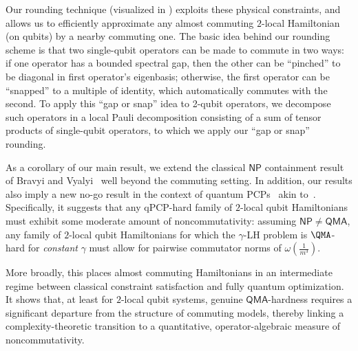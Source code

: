 \documentclass[11pt]{article}
\theoremstyle{plain}
\begin{document}
Our rounding technique (visualized in ) exploits these physical constraints, 
and allows us to
efficiently approximate any almost commuting $2$-local 
Hamiltonian (on qubits) by a nearby commuting one. The basic idea behind our rounding scheme is that two single-qubit operators can be made to commute in two ways: if one operator has a bounded spectral gap, then the other can be ``pinched'' to be diagonal in first operator's eigenbasis; otherwise, the first operator can be ``snapped'' to a multiple of identity, which automatically commutes with the second. To apply this ``gap or snap'' idea to 2-qubit operators, we decompose such operators in a local Pauli decomposition consisting of a sum of tensor products of single-qubit operators, to which we apply our ``gap or snap'' rounding.  

As a corollary of our main result, we extend the classical $\mathsf{NP}$ containment result of Bravyi and Vyalyi~\cite{bravyi2004commutativeversionklocalhamiltonian} well
beyond the commuting setting.
In addition, our results also imply a new no-go result in the context of quantum PCPs~\cite{aharonov2011complexity,Hastings2012} akin to~\cite{arad2011notepartialnogotheorem}. Specifically, it suggests that any qPCP-hard family of $2$-local qubit Hamiltonians must exhibit some moderate amount of noncommutativity: assuming $\mathsf{NP} \neq \mathsf{QMA}$, any
family of $2$-local qubit Hamiltonians for which the $\gamma$-LH problem is $\QMA$-hard for \emph{constant} $\gamma$ must allow for pairwise commutator norms of $\omega(\frac{1}{m^3})$.

More broadly, this places almost commuting Hamiltonians in an intermediate regime between classical constraint satisfaction and fully quantum optimization. It shows that, at least for $2$-local qubit systems, genuine $\mathsf{QMA}$-hardness requires a significant departure from the structure of commuting models, thereby linking a complexity-theoretic transition to a quantitative, operator-algebraic measure of noncommutativity.
\end{document}

